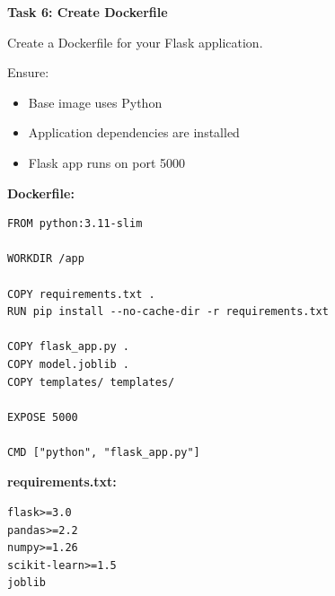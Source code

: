 \documentclass[12pt,a4paper]{article}
\begin{document}
\begin{tcolorbox}
\textbf{Task 6: Create Dockerfile}

Create a Dockerfile for your Flask application.

Ensure:
\begin{itemize}
\item Base image uses Python
\item Application dependencies are installed
\item Flask app runs on port 5000
\end{itemize}

\textbf{Dockerfile:}

\begin{lstlisting}
FROM python:3.11-slim

WORKDIR /app

COPY requirements.txt .
RUN pip install --no-cache-dir -r requirements.txt

COPY flask_app.py .
COPY model.joblib .
COPY templates/ templates/

EXPOSE 5000

CMD ["python", "flask_app.py"]
\end{lstlisting}

\textbf{requirements.txt:}

\begin{lstlisting}
flask>=3.0
pandas>=2.2
numpy>=1.26
scikit-learn>=1.5
joblib
\end{lstlisting}

\end{tcolorbox}

\vspace{12pt}

\end{document}
